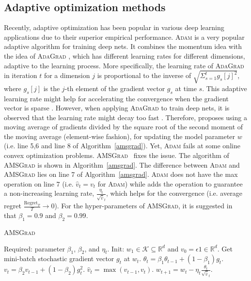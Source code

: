 \documentclass[11pt]{article}
\def\K{\mathcal{K}}
\theoremstyle{k}
\begin{document}
\subsection{Adaptive optimization methods}



Recently, adaptive optimization has been popular in various deep learning applications due to their superior empirical performance. \textsc{Adam} \cite{KB15} is a very popular adaptive algorithm for training deep nets.
It combines the momentum idea \cite{P64} with the idea of \textsc{AdaGrad} \cite{DHS11},
which has different learning rates for different dimensions, adaptive to the learning process. More specifically, the learning rate of \textsc{AdaGrad} in iteration $t$ for a dimension $j$ is proportional to the inverse of $\sqrt{ \Sigma_{s=1}^t g_s[j]^2 }$,
where $g_s[j]$ is the $j$-th element of the gradient vector $g_s$ 
at time $s$.
This adaptive learning rate might help for accelerating the convergence when the gradient vector is sparse \cite{DHS11}. However,
when applying \textsc{AdaGrad} to train deep nets,
it is observed that the learning rate might decay too fast \cite{KB15}.
Therefore, \cite{KB15} proposes using a moving average of gradients 
divided by the square root of the second moment of the moving average (element-wise fashion), for updating the model parameter $w$ (i.e. line 5,6 and line 8 of Algorithm~\ref{amsgrad}).
Yet, \textsc{Adam} \cite{KB15} fails at some online convex optimization problems. \textsc{AMSGrad}~\cite{RKK18} fixes the issue. 
The algorithm of \textsc{AMSGrad} is shown in Algorithm~\ref{amsgrad}.
The difference between \textsc{Adam} and 
\textsc{AMSGrad} lies on line 7 of Algorithm~\ref{amsgrad}.
\textsc{Adam} does not have the max operation on line 7 (i.e. $\hat{v}_t = v_t$ for \textsc{Adam}) while
\cite{RKK18} adds the operation to guarantee a non-increasing learning rate,
$\frac{\eta_t }{ \sqrt{\hat{v}}_t }$,
which helps for the convergence (i.e. average regret $\frac{\text{Regret}_T}{T} \rightarrow 0$).
For the hyper-parameters of \textsc{AMSGrad}, it is suggested in~\cite{RKK18} that $\beta_1=0.9$ and $\beta_2=0.99$.


\begin{algorithm}[H]
\begin{algorithmic}[1]
\small
\caption{\textsc{AMSGrad} \cite{RKK18}} \label{amsgrad}
\STATE Required: parameter $\beta_1$, $\beta_2$, and $\eta_t$. 
\STATE Init: $w_{1} \in \K \subseteq \mathbb R^d $ and $v_{0} = \epsilon 1 \in \mathbb R^{d}$.
\STATE Get mini-batch stochastic gradient vector $g_t$ at $w_t$.
\STATE $\theta_t = \beta_1 \theta_{t-1} + (1 - \beta_1) g_t$.
\STATE $v_t = \beta_2 v_{t-1} + (1 - \beta_2) g_t^2$. 
\STATE $\hat{v}_t = \max( \hat{v}_{t-1} , v_t )$. 
\STATE $w_{t+1} = w_t - \eta_t \frac{\theta_t}{ \sqrt{\hat{v}}_t }$.
\ENDFOR
\end{algorithmic}
\end{algorithm}
\end{document}
